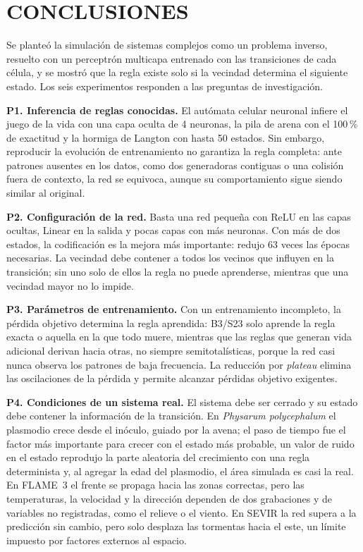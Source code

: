 \section{CONCLUSIONES}
\label{sec:conclusiones}

Se planteó la simulación de sistemas complejos como un problema inverso, resuelto con un perceptrón multicapa entrenado con las transiciones de cada célula, y se mostró que la regla existe solo si la vecindad determina el siguiente estado. Los seis experimentos responden a las preguntas de investigación.

\textbf{P1. Inferencia de reglas conocidas.} El autómata celular neuronal infiere el juego de la vida con una capa oculta de 4 neuronas, la pila de arena con el 100\,\% de exactitud y la hormiga de Langton con hasta 50 estados. Sin embargo, reproducir la evolución de entrenamiento no garantiza la regla completa: ante patrones ausentes en los datos, como dos generadoras contiguas o una colisión fuera de contexto, la red se equivoca, aunque su comportamiento sigue siendo similar al original.

\textbf{P2. Configuración de la red.} Basta una red pequeña con ReLU en las capas ocultas, Linear en la salida y pocas capas con más neuronas. Con más de dos estados, la codificación \onehot{} es la mejora más importante: redujo 63 veces las épocas necesarias. La vecindad debe contener a todos los vecinos que influyen en la transición; sin uno solo de ellos la regla no puede aprenderse, mientras que una vecindad mayor no lo impide.

\textbf{P3. Parámetros de entrenamiento.} Con un entrenamiento incompleto, la pérdida objetivo determina la regla aprendida: B3/S23 solo aprende la regla exacta o aquella en la que todo muere, mientras que las reglas que generan vida adicional derivan hacia otras, no siempre semitotalísticas, porque la red casi nunca observa los patrones de baja frecuencia. La reducción por \textit{plateau} elimina las oscilaciones de la pérdida y permite alcanzar pérdidas objetivo exigentes.

\textbf{P4. Condiciones de un sistema real.} El sistema debe ser cerrado y su estado debe contener la información de la transición. En \textit{Physarum polycephalum} el plasmodio crece desde el inóculo, guiado por la avena; el paso de tiempo fue el factor más importante para crecer con el estado más probable, un valor de ruido en el estado reprodujo la parte aleatoria del crecimiento con una regla determinista y, al agregar la edad del plasmodio, el área simulada es casi la real. En FLAME~3 el frente se propaga hacia las zonas correctas, pero las temperaturas, la velocidad y la dirección dependen de dos grabaciones y de variables no registradas, como el relieve o el viento. En SEVIR la red supera a la predicción sin cambio, pero solo desplaza las tormentas hacia el este, un límite impuesto por factores externos al espacio.

